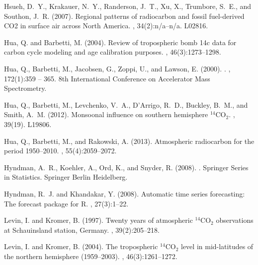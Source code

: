 \documentclass[a4paper, 11pt]{article}
\begin{document}
\begin{thebibliography}{}
Hsueh, D.~Y., Krakauer, N.~Y., Randerson, J.~T., Xu, X., Trumbore, S.~E., and
  Southon, J.~R. (2007).
\newblock Regional patterns of radiocarbon and fossil fuel-derived {CO2} in
  surface air across {North America}.
, 34(2):n/a--n/a.
\newblock L02816.

Hua, Q. and Barbetti, M. (2004).
\newblock Review of tropospheric bomb 14c data for carbon cycle modeling and
  age calibration purposes.
, 46(3):1273--1298.

Hua, Q., Barbetti, M., Jacobsen, G., Zoppi, U., and Lawson, E. (2000).
.
, 172(1):359 -- 365.
\newblock 8th International Conference on Accelerator Mass Spectrometry.

Hua, Q., Barbetti, M., Levchenko, V.~A., D'Arrigo, R.~D., Buckley, B.~M., and
  Smith, A.~M. (2012).
\newblock Monsoonal influence on southern hemisphere {$^{14}$CO$_2$}.
, 39(19).
\newblock L19806.

Hua, Q., Barbetti, M., and Rakowski, A. (2013).
\newblock Atmospheric radiocarbon for the period 1950--2010.
, 55(4):2059--2072.

Hyndman, A.~R., Koehler, A., Ord, K., and Snyder, R. (2008).
.
\newblock Springer Series in Statistics. Springer Berlin Heidelberg.

Hyndman, R.~J. and Khandakar, Y. (2008).
\newblock Automatic time series forecasting: The forecast package for {R}.
, 27(3):1--22.

Levin, I. and Kromer, B. (1997).
\newblock Twenty years of atmospheric {$^{14}$CO$_2$} observations at
  {Schauinsland station, Germany}.
, 39(2):205--218.

Levin, I. and Kromer, B. (2004).
\newblock The tropospheric {$^{14}$CO$_2$} level in mid-latitudes of the
  northern hemisphere (1959--2003).
, 46(3):1261--1272.


\end{thebibliography}
\end{document}
